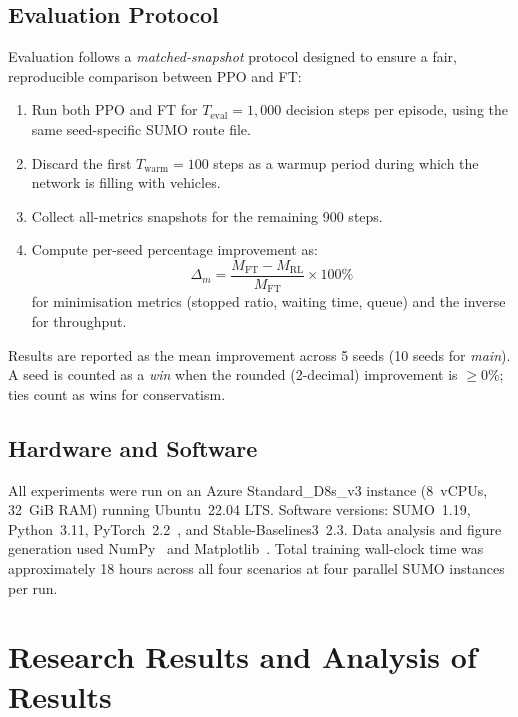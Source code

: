 \documentclass[12pt,oneside,a4paper]{report}
\newcommand{\ppo}{\textsc{PPO}}
\newcommand{\ft}{\textsc{FT}}
\begin{document}
\section{Evaluation Protocol}
\label{sec:eval}

Evaluation follows a \emph{matched-snapshot} protocol designed to
ensure a fair, reproducible comparison between \ppo{} and \ft{}:

\begin{enumerate}[leftmargin=*]
  \item Run both \ppo{} and \ft{} for
        $T_\text{eval} = 1{,}000$ decision steps per episode,
        using the same seed-specific SUMO route file.
  \item Discard the first $T_\text{warm} = 100$ steps as a
        warmup period during which the network is filling with
        vehicles.
  \item Collect all-metrics snapshots for the remaining 900 steps.
  \item Compute per-seed percentage improvement as:
        \[
          \Delta_m =
          \frac{M_\text{FT} - M_\text{RL}}{M_\text{FT}} \times 100\%
        \]
        for minimisation metrics (stopped ratio, waiting time, queue)
        and the inverse for throughput.
\end{enumerate}

Results are reported as the mean improvement across 5 seeds
(10 seeds for \textit{main}).  A seed is counted as a \emph{win}
when the rounded (2-decimal) improvement is $\geq 0\%$; ties
count as wins for conservatism.

\section{Hardware and Software}
\label{sec:hardware}

All experiments were run on an Azure Standard\_D8s\_v3 instance
(8~vCPUs, 32~GiB RAM) running Ubuntu~22.04 LTS.  Software
versions: SUMO~1.19, Python~3.11, PyTorch~2.2~\cite{pytorch2019}, and
Stable-Baselines3~2.3.  Data analysis and figure generation used
NumPy~\cite{numpy2020} and Matplotlib~\cite{matplotlib2007}.
Total training wall-clock time was approximately 18 hours across
all four scenarios at four parallel SUMO instances per run.

\chapter{Research Results and Analysis of Results}
\label{chap:results}
\end{document}
